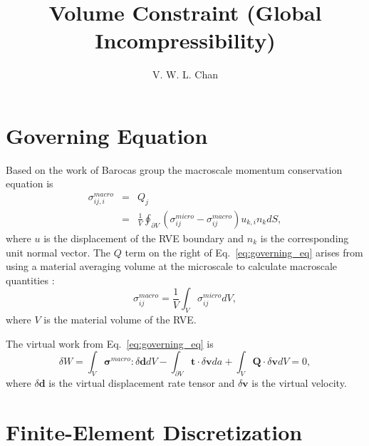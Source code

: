 \documentclass[12pt,aps,pre]{revtex4}
\begin{document}
\title{Volume Constraint (Global Incompressibility)}
\author{V. W. L. Chan}
\maketitle

\section{Governing Equation}

Based on the work of Barocas group \cite{Chandran:2007hy,Stylianopoulos:2007dp} the macroscale momentum conservation equation is
%
\begin{eqnarray}
\sigma^{macro}_{ij,i} &=& Q_j \nonumber\\
%
&=&\frac{1}{V} \oint_{\partial V} \left( \sigma^{micro}_{ij} - \sigma^{macro}_{ij} \right)u_{k,i}n_k dS,
\label{eq:governing_eq}
\end{eqnarray}
%
where $u$ is the displacement of the RVE boundary and $n_k$ is the corresponding unit normal vector. The $Q$ term on the right of Eq.\ \eqref{eq:governing_eq} arises from using a material averaging volume at the microscale to calculate macroscale quantities \cite{Chandran:2007hy}:
%
\begin{equation}
\sigma_{ij}^{macro} = \frac{1}{V}\int_{V}\sigma_{ij}^{micro} dV,
\end{equation}
%
where $V$ is the material volume of the RVE.

The virtual work from Eq.\ \eqref{eq:governing_eq} is \cite{JavierBonet:2008uxa}
%
\begin{equation}
\delta W = \int_V \pmb{\sigma}^{macro} : \delta\pmb{d} dV - \int_{\partial V} \pmb{t} \cdot \delta \pmb{v} da + \int_V \pmb{Q} \cdot \delta \pmb{v} dV = 0,
\label{eq:weak_form}
\end{equation}
%
where $\delta \pmb{d}$ is the virtual displacement rate tensor and $\delta \pmb{v}$ is the virtual velocity.

\section{Finite-Element Discretization}
\end{document}
